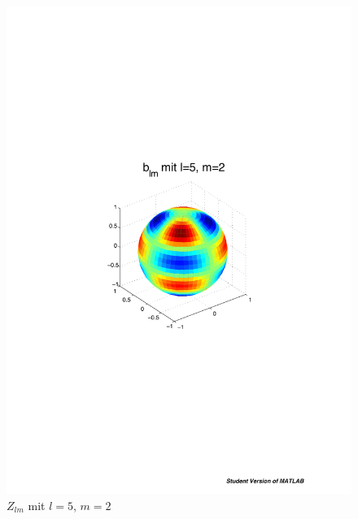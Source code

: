 \begin{refsection}
\begin{figure}
\begin{minipage}[hbt]{0.4\textwidth}
\includegraphics[width=1\textwidth]{kugel/ylm/b_5_2.pdf}
\caption{$Z_{lm}$ mit $l=5$, $m=2$}
\label{skript:zlm l=5 m=2}
\end{minipage}
\end{figure}


\end{refsection}
